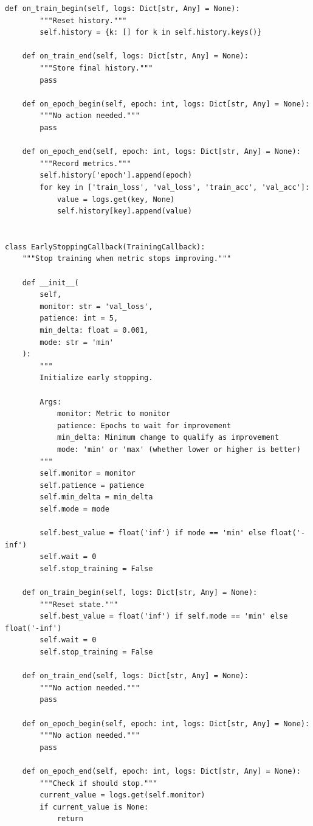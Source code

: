 \begin{lstlisting}[style=python, caption=Observer pattern for monitoring training]
    def on_train_begin(self, logs: Dict[str, Any] = None):
        """Reset history."""
        self.history = {k: [] for k in self.history.keys()}

    def on_train_end(self, logs: Dict[str, Any] = None):
        """Store final history."""
        pass

    def on_epoch_begin(self, epoch: int, logs: Dict[str, Any] = None):
        """No action needed."""
        pass

    def on_epoch_end(self, epoch: int, logs: Dict[str, Any] = None):
        """Record metrics."""
        self.history['epoch'].append(epoch)
        for key in ['train_loss', 'val_loss', 'train_acc', 'val_acc']:
            value = logs.get(key, None)
            self.history[key].append(value)


class EarlyStoppingCallback(TrainingCallback):
    """Stop training when metric stops improving."""

    def __init__(
        self,
        monitor: str = 'val_loss',
        patience: int = 5,
        min_delta: float = 0.001,
        mode: str = 'min'
    ):
        """
        Initialize early stopping.

        Args:
            monitor: Metric to monitor
            patience: Epochs to wait for improvement
            min_delta: Minimum change to qualify as improvement
            mode: 'min' or 'max' (whether lower or higher is better)
        """
        self.monitor = monitor
        self.patience = patience
        self.min_delta = min_delta
        self.mode = mode

        self.best_value = float('inf') if mode == 'min' else float('-inf')
        self.wait = 0
        self.stop_training = False

    def on_train_begin(self, logs: Dict[str, Any] = None):
        """Reset state."""
        self.best_value = float('inf') if self.mode == 'min' else float('-inf')
        self.wait = 0
        self.stop_training = False

    def on_train_end(self, logs: Dict[str, Any] = None):
        """No action needed."""
        pass

    def on_epoch_begin(self, epoch: int, logs: Dict[str, Any] = None):
        """No action needed."""
        pass

    def on_epoch_end(self, epoch: int, logs: Dict[str, Any] = None):
        """Check if should stop."""
        current_value = logs.get(self.monitor)
        if current_value is None:
            return


\end{lstlisting}
